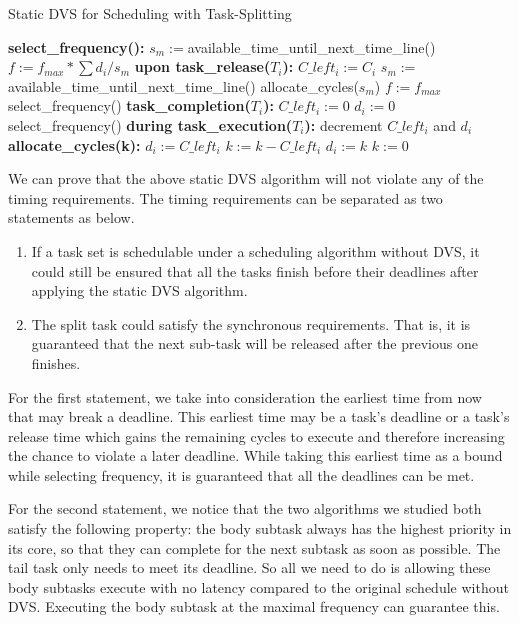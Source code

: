 \documentclass[12pt, journal,compsoc]{IEEEtran}
\begin{document}
\begin{algorithm}
\caption{Static DVS for Scheduling with Task-Splitting}
\label{ag-post}
\begin{algorithmic}[1]
\STATE \textbf{select\_frequency():}
\STATE $s_m:=$available\_time\_until\_next\_time\_line()
\STATE $f:=f_{max}*\sum d_i/s_m$
\vspace{0.05in}
\STATE \textbf{upon task\_release($T_i$):}
\STATE $C\_left_i:=C_i$
\STATE $s_m:=$available\_time\_until\_next\_time\_line()
\STATE allocate\_cycles($s_m$)
\STATE $f:=f_{max}$
\ELSE
\STATE select\_frequency()
\ENDIF
\vspace{0.05in}
\STATE \textbf{task\_completion($T_i$):}
\STATE $C\_left_i:=0$
\STATE $d_i:=0$
\STATE select\_frequency()
\vspace{0.05in}
\STATE \textbf{during task\_execution($T_i$):}
\STATE decrement $C\_left_i$ and $d_i$
\vspace{0.05in}
\STATE \textbf{allocate\_cycles(k):}
\STATE $d_i:=C\_left_i$
\STATE $k:=k-C\_left_i$
\ELSE
\STATE $d_i:=k$
\STATE $k:=0$
\ENDIF
\ENDFOR
\end{algorithmic}
\end{algorithm}

We can prove that the above static DVS algorithm will not violate any of the timing requirements. The timing requirements can be separated as two statements as below.

\begin{enumerate}
\item If a task set is schedulable under a scheduling algorithm without DVS, it could still be ensured that all the tasks finish before their deadlines after applying the static DVS algorithm.
\item The split task could satisfy the synchronous requirements. That is, it is guaranteed that the next sub-task will be released after the previous one finishes.
\end{enumerate}

For the first statement, we take into consideration the earliest time from now that may break a deadline. This earliest time may be a task's deadline or a task's release time which gains the remaining cycles to execute and therefore increasing the chance to violate a later deadline. While taking this earliest time as a bound while selecting frequency, it is guaranteed that all the deadlines can be met.

For the second statement, we notice that the two algorithms \cite{Guan:2010:FMS:1828428.1829220} \cite{Lakshmanan:2009:PFP:1581378.1581523} we studied both satisfy the following property: the body subtask always has the highest priority in its core, so that they can complete for the next subtask as soon as possible. The tail task only needs to meet its deadline. So all we need to do is allowing these body subtasks execute with no latency compared to the original schedule without DVS. Executing the body subtask at the maximal frequency can guarantee this.
\end{document}
